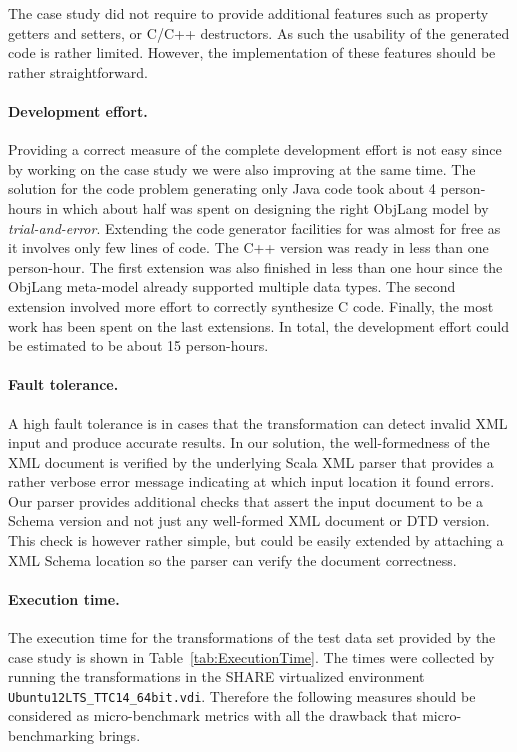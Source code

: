 The case study did not require to provide additional features such as property getters and setters, or C/C++ destructors.
As such the usability of the generated code is rather limited.
However, the implementation of these features should be rather straightforward.

\paragraph{Development effort.}

Providing a correct measure of the complete development effort is not easy since by working on the case study we were also improving \SIGMA at the same time.
The solution for the code problem generating only Java code took about 4 person-hours in which about half was spent on designing the right ObjLang model by \emph{trial-and-error}.
Extending the code generator facilities for \Csharp was almost for free as it involves only few lines of code.
The C++ version was ready in less than one person-hour.
The first extension was also finished in less than one hour since the ObjLang meta-model already supported multiple data types.
The second extension involved more effort to correctly synthesize C code.
Finally, the most work has been spent on the last extensions.
In total, the development effort could be estimated to be about 15 person-hours.

\paragraph{Fault tolerance.}
%
A high fault tolerance is in cases that the transformation can detect invalid XML input and produce accurate results.
In our solution, the well-formedness of the XML document is verified by the underlying Scala XML parser that provides a rather verbose error message indicating at which input location it found errors.
Our parser provides additional checks that assert the input document to be a  Schema version and not just any well-formed XML document or \FIXML DTD version.
This check is however rather simple, but could be easily extended by attaching a \FIXML XML Schema location so the parser can verify the document correctness.

\paragraph{Execution time.}

The execution time for the transformations of the test data set provided by the case study is shown in Table~\ref{tab:ExecutionTime}.
The times were collected by running the transformations in the SHARE virtualized environment \texttt{Ubuntu12LTS\_TTC14\_64bit\SIGMA.vdi}.
Therefore the following measures should be considered as micro-benchmark metrics with all the drawback that micro-benchmarking brings.

